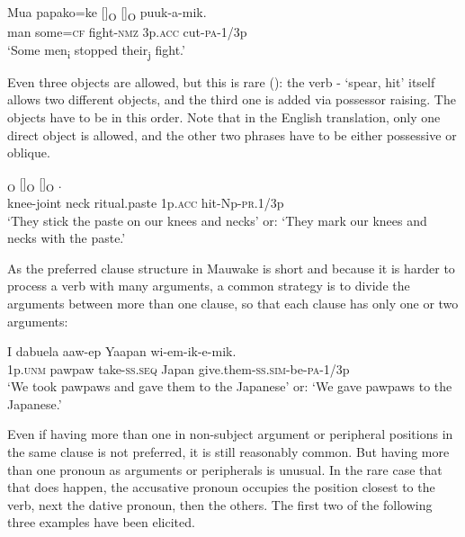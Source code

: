 \ea%
\label{ex:x949}
\gll Mua  papako=ke  []\textsubscript{O}  []\textsubscript{O}  puuk-a-mik. \\
     man  some=\textsc{cf}  fight-\textsc{nmz}  3p.\textsc{acc}  cut-\textsc{pa}-1/3p \\
\glt `Some men\textsubscript{i} stopped their\textsubscript{j} fight.'
\z

Even three objects are allowed, but this is rare (): the verb - `spear, hit' itself allows two different objects, and the third one is added via possessor raising. The objects have to be in this order. Note that in the English translation, only one direct object is allowed, and the other two phrases have to be either possessive or oblique.

\ea%
\label{ex:x953}
\textsubscript{O}  []\textsubscript{O}  []\textsubscript{O}  . \\
     knee-joint  neck  ritual.paste  1p.\textsc{acc}  hit-Np-\textsc{pr}.1/3p \\
\glt `They stick the  paste on our knees and necks' or: `They mark our knees and necks with the  paste.'
\z

As the preferred clause structure in Mauwake is short and because it is harder to process a verb with many arguments, a common strategy is to divide the arguments between more than one clause, so that each clause has only one or two arguments:

\ea%
\label{ex:x967}
\gll I  dabuela  aaw-ep  Yaapan  wi-em-ik-e-mik. \\
     1p.\textsc{unm}  pawpaw  take-\textsc{ss}.\textsc{seq}  Japan  give.them-\textsc{ss}.\textsc{sim}-be-\textsc{pa}-1/3p \\
\glt `We took pawpaws and gave them to the Japanese' or: `We gave pawpaws to the Japanese.'
\z

Even if having more than one  in non-subject argument or peripheral positions in the same clause is not preferred, it is still reasonably common. But having more than one pronoun as arguments or peripherals is unusual. In the rare case that that does happen, the accusative pronoun occupies the position closest to the verb, next the dative pronoun, then the others. The first two of the following three examples have been elicited.

